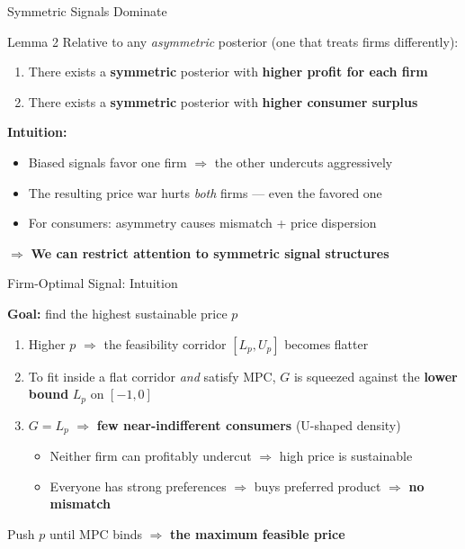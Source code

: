 \documentclass[aspectratio=169, 11pt]{beamer}
\begin{document}
\begin{frame}{Symmetric Signals Dominate}

\begin{block}{Lemma 2}
Relative to any \emph{asymmetric} posterior (one that treats firms differently):
\begin{enumerate}
    \item[(i)] There exists a \textbf{symmetric} posterior with \textbf{higher profit for each firm}
    \item[(ii)] There exists a \textbf{symmetric} posterior with \textbf{higher consumer surplus}
\end{enumerate}
\end{block}

\bigskip

\textbf{Intuition:}
\begin{itemize}
    \item Biased signals favor one firm $\Rightarrow$ the other undercuts aggressively
    \item The resulting price war hurts \emph{both} firms --- even the favored one
    \item For consumers: asymmetry causes mismatch + price dispersion
\end{itemize}

\bigskip

$\Rightarrow$ \textbf{We can restrict attention to symmetric signal structures}

\end{frame}

\begin{frame}{Firm-Optimal Signal: Intuition}

\textbf{Goal:} find the highest sustainable price $p$

\bigskip

\begin{enumerate}
    \item Higher $p$ $\Rightarrow$ the feasibility corridor $[L_p, U_p]$ becomes flatter

    \bigskip

    \item To fit inside a flat corridor \emph{and} satisfy MPC, $G$ is squeezed against the \textbf{lower bound} $L_p$ on $[-1,0]$

    \bigskip

    \item $G = L_p$ $\Rightarrow$ \textbf{few near-indifferent consumers} (U-shaped density)
    \begin{itemize}
        \item Neither firm can profitably undercut $\Rightarrow$ high price is sustainable
        \item Everyone has strong preferences $\Rightarrow$ buys preferred product $\Rightarrow$ \textbf{no mismatch}
    \end{itemize}
\end{enumerate}

\bigskip

Push $p$ until MPC binds $\Rightarrow$ \textbf{the maximum feasible price}

\end{frame}
\end{document}
